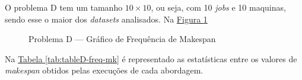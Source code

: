 O problema D tem um tamanho $10 \times 10$, ou seja, com 10 \textit{jobs} e 10 maquinas, 
sendo esse o maior dos \textit{datasets} analisados.
Na \hyperref[fig:plobD-freq-mk]{Figura \ref{fig:plobD-freq-mk}} 
\begin{figure}[!htb]
    \caption{Problema D — Gráfico de Frequência de Makespan}
    \label{fig:plobD-freq-mk}
    \begin{minipage}{.5\linewidth}
        \centering
        \subfloat[]{
            \label{plobD-freq-mk:a}
            \resizebox{\linewidth}{!}{}
        }
    \end{minipage}%
    \begin{minipage}{.5\linewidth}
        \centering
        \subfloat[]{
            \label{plobD-freq-mk:b}
            \resizebox{\linewidth}{!}{}
        }
    \end{minipage}\par\medskip
      \centering
      \subfloat[]{
        \label{plobD-freq-mk:c}
        \resizebox{.5\linewidth}{!}{}
      }
\end{figure}
Na
\hyperref[tab:tableD-freq-mk]{Tabela \ref{tab:tableD-freq-mk}}
é representado as estatísticas entre os valores de \textit{makespan} obtidos pelas execuções de cada abordagem.
